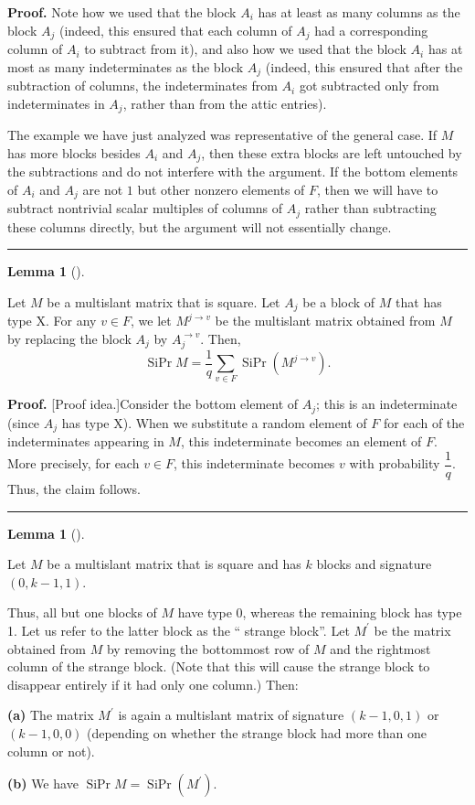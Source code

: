 \documentclass[numbers=enddot,12pt,final,onecolumn,notitlepage]{scrartcl}%
\theoremstyle{definition}
\newtheorem{lem}[theo]{Lemma}
\newenvironment{lemma}[1][]
{\begin{lem}[#1]\begin{leftbar}}
{\end{leftbar}\end{lem}}
\newenvironment{proof}[1][Proof]{\noindent\textbf{#1.} }{\ \rule{0.5em}{0.5em}}
\let\sumnonlimits\sum
\renewcommand{\sum}{\sumnonlimits\limits}
\theoremstyle{plainsl}
\begin{document}
\begin{proof}
Note how we used that the block $A_{i}$ has at least as many columns as the
block $A_{j}$ (indeed, this ensured that each column of $A_{j}$ had a
corresponding column of $A_{i}$ to subtract from it), and also how we used
that the block $A_{i}$ has at most as many indeterminates as the block $A_{j}$
(indeed, this ensured that after the subtraction of columns, the
indeterminates from $A_{i}$ got subtracted only from indeterminates in $A_{j}%
$, rather than from the attic entries).

The example we have just analyzed was representative of the general case. If
$M$ has more blocks besides $A_{i}$ and $A_{j}$, then these extra blocks are
left untouched by the subtractions and do not interfere with the argument. If
the bottom elements of $A_{i}$ and $A_{j}$ are not $1$ but other nonzero
elements of $F$, then we will have to subtract nontrivial scalar multiples of
columns of $A_{j}$ rather than subtracting these columns directly, but the
argument will not essentially change.
\end{proof}

\begin{lemma}
\label{lem.multislant.redX}Let $M$ be a multislant matrix that is square. Let
$A_{j}$ be a block of $M$ that has type X. For any $v\in F$, we let
$M^{j\rightarrow v}$ be the multislant matrix obtained from $M$ by replacing
the block $A_{j}$ by $A_{j}^{\rightarrow v}$. Then,
\[
\operatorname*{SiPr}M=\dfrac{1}{q}\sum_{v\in F}\operatorname*{SiPr}\left(
M^{j\rightarrow v}\right)  .
\]

\end{lemma}

\begin{proof}
[Proof idea.]Consider the bottom element of $A_{j}$; this is an indeterminate
(since $A_{j}$ has type X). When we substitute a random element of $F$ for
each of the indeterminates appearing in $M$, this indeterminate becomes an
element of $F$. More precisely, for each $v\in F$, this indeterminate becomes
$v$ with probability $\dfrac{1}{q}$. Thus, the claim follows.
\end{proof}

\begin{lemma}
\label{lem.multislant.red01}Let $M$ be a multislant matrix that is square and
has $k$ blocks and signature $\left(  0,k-1,1\right)  $.

Thus, all but one blocks of $M$ have type 0, whereas the remaining block has
type 1. Let us refer to the latter block as the `` strange
block''. Let $M^{\prime}$ be the matrix obtained from $M$ by
removing the bottommost row of $M$ and the rightmost column of the strange
block. (Note that this will cause the strange block to disappear entirely if
it had only one column.) Then:

\textbf{(a)} The matrix $M^{\prime}$ is again a multislant matrix of signature
$\left(  k-1,0,1\right)  $ or $\left(  k-1,0,0\right)  $ (depending on whether
the strange block had more than one column or not).

\textbf{(b)} We have $\operatorname*{SiPr}M=\operatorname*{SiPr}\left(
M^{\prime}\right)  $.
\end{lemma}
\end{document}
